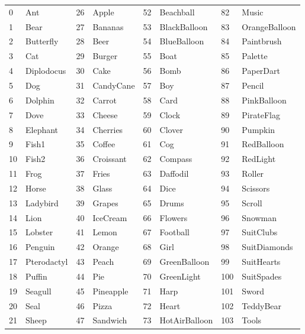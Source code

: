 \documentclass[12pt,a4paper,twoside]{article}
\renewcommand{\_}{\texttt{\symbol{95}}}
\begin{document}
\begin{tabular}{|ll|ll|ll|ll|}
\hline
\rule{0mm}{4.5mm}%
  0 & Ant         & 26 & Apple      & 52 & Beachball       &  82 & Music\\
  1 & Bear        & 27 & Bananas    & 53 & BlackBalloon    &  83 & OrangeBalloon\\
  2 & Butterfly   & 28 & Beer       & 54 & BlueBalloon     &  84 & Paintbrush\\
  3 & Cat         & 29 & Burger     & 55 & Boat            &  85 & Palette\\
  4 & Diplodocus  & 30 & Cake       & 56 & Bomb            &  86 & PaperDart\\
  5 & Dog         & 31 & CandyCane  & 57 & Boy             &  87 & Pencil\\
  6 & Dolphin     & 32 & Carrot     & 58 & Card            &  88 & PinkBalloon\\
  7 & Dove        & 33 & Cheese     & 59 & Clock           &  89 & PirateFlag\\
  8 & Elephant    & 34 & Cherries   & 60 & Clover          &  90 & Pumpkin\\
  9 & Fish1       & 35 & Coffee     & 61 & Cog             &  91 & RedBalloon\\
 10 & Fish2       & 36 & Croissant  & 62 & Compass         &  92 & RedLight\\
 11 & Frog        & 37 & Fries      & 63 & Daffodil        &  93 & Roller\\
 12 & Horse       & 38 & Glass      & 64 & Dice            &  94 & Scissors\\
 13 & Ladybird    & 39 & Grapes     & 65 & Drums           &  95 & Scroll\\
 14 & Lion        & 40 & IceCream   & 66 & Flowers         &  96 & Snowman\\
 15 & Lobster     & 41 & Lemon      & 67 & Football        &  97 & SuitClubs\\
 16 & Penguin     & 42 & Orange     & 68 & Girl            &  98 & SuitDiamonds\\
 17 & Pterodactyl & 43 & Peach      & 69 & GreenBalloon    &  99 & SuitHearts\\
 18 & Puffin      & 44 & Pie        & 70 & GreenLight      & 100 & SuitSpades\\
 19 & Seagull     & 45 & Pineapple  & 71 & Harp            & 101 & Sword\\
 20 & Seal        & 46 & Pizza      & 72 & Heart           & 102 & TeddyBear\\
 21 & Sheep       & 47 & Sandwich   & 73 & HotAirBalloon   & 103 & Tools\\

\end{tabular}
\end{document}
